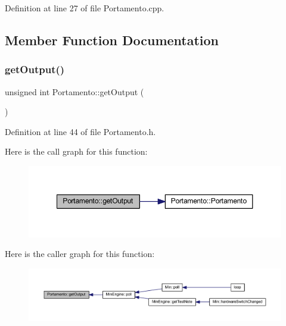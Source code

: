 Definition at line 27 of file Portamento.\+cpp.



\subsection{Member Function Documentation}
\mbox{\label{class_portamento_ac9c42e58272962a5a7f7d0300ba2e595}} 
\subsubsection{\texorpdfstring{get\+Output()}{getOutput()}}
{\footnotesize\ttfamily unsigned int Portamento\+::get\+Output (\begin{DoxyParamCaption}{ }\end{DoxyParamCaption})\hspace{0.3cm}{\ttfamily [inline]}}



Definition at line 44 of file Portamento.\+h.

Here is the call graph for this function\+:
\nopagebreak
\begin{figure}[H]
\begin{center}
\leavevmode
\includegraphics[width=350pt]{d4/d10/class_portamento_ac9c42e58272962a5a7f7d0300ba2e595_cgraph}
\end{center}
\end{figure}
Here is the caller graph for this function\+:
\nopagebreak
\begin{figure}[H]
\begin{center}
\leavevmode
\includegraphics[width=350pt]{d4/d10/class_portamento_ac9c42e58272962a5a7f7d0300ba2e595_icgraph}
\end{center}
\end{figure}
\mbox{\label{class_portamento_a2cc6e550905558daac49cbef693c62fb}} 
